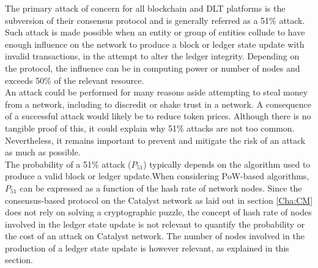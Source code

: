 The primary attack of concern for all blockchain and DLT platforms is the subversion of their consensus protocol and is generally referred as a 51\% attack. Such attack is made possible when an entity or group of entities collude to have enough influence on the network to produce a block or ledger state update with invalid transactions, in the attempt to alter the ledger integrity. Depending on the protocol, the influence can be in computing power or number of nodes and exceeds 50\% of the relevant resource. \\

An attack could be performed for many reasons aside attempting to steal money from a network, including to discredit or shake trust in a network. A consequence of a successful attack would likely be to reduce token prices. Although there is no tangible proof of this, it could explain why 51\% attacks are not too common. Nevertheless, it remains important to prevent and mitigate the risk of an attack as much as possible.\\

The probability of a 51\% attack ($P_{51}$) typically depends on the algorithm used to produce a valid block or ledger update.When considering PoW-based algorithms, $P_{51}$ can be expressed as a function of the hash rate of network nodes. Since the consensus-based protocol on the Catalyst network as laid out in section \ref{Cha:CM} does not rely on solving a cryptographic puzzle, the concept of hash rate of nodes involved in the ledger state update is not relevant to quantify the probability or the cost of an attack on Catalyst network. The number of nodes involved in the production of a ledger state update is however relevant, as explained in this section. \\ 

